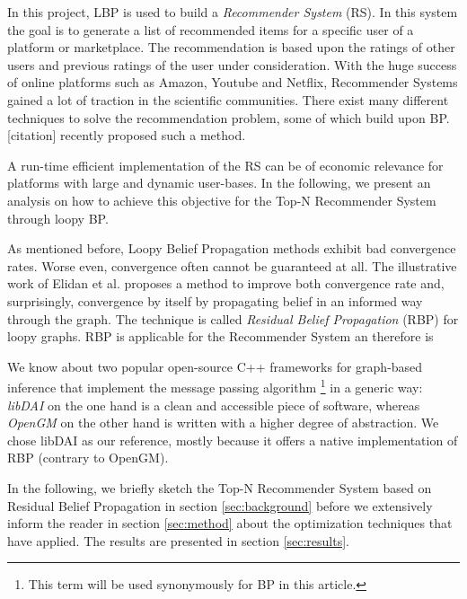In this project, LBP is used to build a \textit{Recommender System} (RS). In this system the goal is to generate a list of recommended items for a specific user of a platform or marketplace. The recommendation is based upon the ratings of other users and previous ratings of the user under consideration. With the huge success of online platforms such as Amazon, Youtube and Netflix, Recommender Systems gained a lot of traction in the scientific communities. There exist many different techniques to solve the recommendation problem, some of which build upon BP. [citation] recently proposed such a method. 

A run-time efficient implementation of the RS can be of economic relevance for platforms with large and dynamic user-bases. In the following, we present an analysis on how to achieve this objective for the Top-N Recommender System through loopy BP.

As mentioned before, Loopy Belief Propagation methods exhibit bad convergence rates. Worse even, convergence often cannot be guaranteed at all. The illustrative work of Elidan et al. \cite{elidan2012residual} proposes a method to improve both convergence rate and, surprisingly, convergence by itself by propagating belief in an informed way through the graph. The technique is called \textit{Residual Belief Propagation} (RBP) for loopy graphs. RBP is applicable for the Recommender System an therefore is 

We know about two popular open-source C++ frameworks for graph-based inference that implement the message passing algorithm \footnote{This term will be used synonymously for BP in this article.} in a generic way: \textit{libDAI} \cite{Mooij_libDAI_10} on the one hand is a clean and accessible piece of software, whereas \textit{OpenGM} \cite{andres2012opengm} on the other hand is written with a higher degree of abstraction. We chose libDAI as our reference, mostly because it offers a native implementation of RBP (contrary to OpenGM).

In the following, we briefly sketch the Top-N Recommender System based on Residual Belief Propagation in section \ref{sec:background} before we extensively inform the reader in section \ref{sec:method} about the optimization techniques that have applied. The results are presented in section \ref{sec:results}.